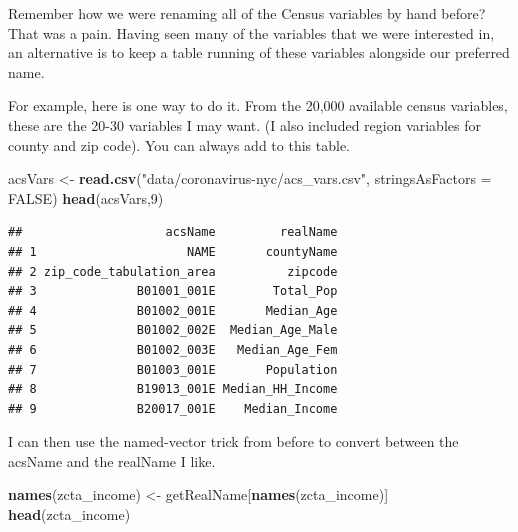 \documentclass[openany]{book}
\newenvironment{Shaded}{\begin{snugshade}}{\end{snugshade}}
\newcommand{\DataTypeTok}[1]{\textcolor[rgb]{0.13,0.29,0.53}{#1}}
\newcommand{\DecValTok}[1]{\textcolor[rgb]{0.00,0.00,0.81}{#1}}
\newcommand{\KeywordTok}[1]{\textcolor[rgb]{0.13,0.29,0.53}{\textbf{#1}}}
\newcommand{\NormalTok}[1]{#1}
\newcommand{\OperatorTok}[1]{\textcolor[rgb]{0.81,0.36,0.00}{\textbf{#1}}}
\newcommand{\OtherTok}[1]{\textcolor[rgb]{0.56,0.35,0.01}{#1}}
\newcommand{\StringTok}[1]{\textcolor[rgb]{0.31,0.60,0.02}{#1}}
\begin{document}
Remember how we were renaming all of the Census variables by hand before? That was a pain. Having seen many of the variables that we were interested in, an alternative is to keep a table running of these variables alongside our preferred name.

For example, here is one way to do it. From the 20,000 available census variables, these are the 20-30 variables I may want. (I also included region variables for county and zip code). You can always add to this table.

\begin{Shaded}
\begin{Highlighting}[]
\NormalTok{acsVars <-}\StringTok{ }\KeywordTok{read.csv}\NormalTok{(}\StringTok{"data/coronavirus-nyc/acs_vars.csv"}\NormalTok{, }\DataTypeTok{stringsAsFactors =} \OtherTok{FALSE}\NormalTok{)}
\KeywordTok{head}\NormalTok{(acsVars,}\DecValTok{9}\NormalTok{)}
\end{Highlighting}
\end{Shaded}

\begin{verbatim}
##                    acsName         realName
## 1                     NAME       countyName
## 2 zip_code_tabulation_area          zipcode
## 3              B01001_001E        Total_Pop
## 4              B01002_001E       Median_Age
## 5              B01002_002E  Median_Age_Male
## 6              B01002_003E   Median_Age_Fem
## 7              B01003_001E       Population
## 8              B19013_001E Median_HH_Income
## 9              B20017_001E    Median_Income
\end{verbatim}

I can then use the named-vector trick from before to convert between the acsName and the realName I like.

\begin{Shaded}
\end{Shaded}

\begin{Shaded}
\begin{Highlighting}[]
\KeywordTok{names}\NormalTok{(zcta_income) <-}\StringTok{ }\NormalTok{getRealName[}\KeywordTok{names}\NormalTok{(zcta_income)]}
\KeywordTok{head}\NormalTok{(zcta_income)}
\end{Highlighting}
\end{Shaded}
\end{document}
